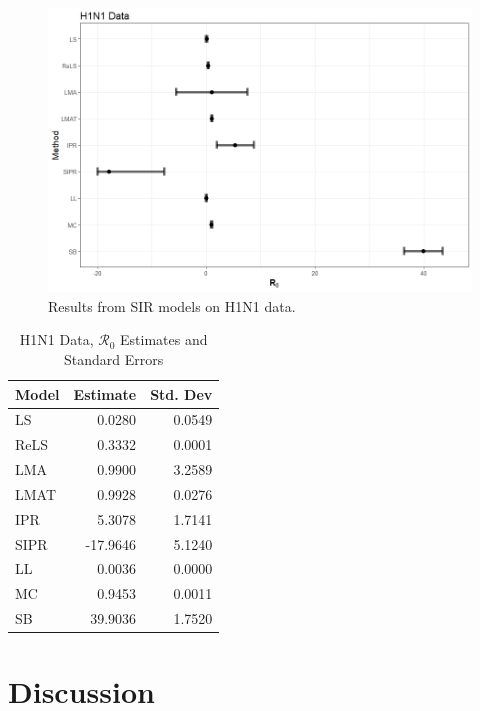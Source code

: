 \documentclass[12pt]{article}
\newcommand{\rr}{\ensuremath{\mathcal{R}_0}}
\begin{document}
\begin{figure}[H]
	\centering
	\includegraphics[width=\textwidth]{images/h1n1.jpeg}
	\caption{Results from SIR models on H1N1 data.}
\end{figure}

\begin{table}[H]
	
	
	\centering
	\begin{tabular}[t]{l|r|r}
		\hline
		Model & Estimate & Std. Dev\\
		\hline
		LS & 0.0280 & 0.0549\\
		\hline
		ReLS & 0.3332 & 0.0001\\
		\hline
		LMA & 0.9900 & 3.2589\\
		\hline
		LMAT & 0.9928 & 0.0276\\
		\hline
		IPR & 5.3078 & 1.7141\\
		\hline
		SIPR & -17.9646 & 5.1240\\
		\hline
		LL & 0.0036 & 0.0000\\
		\hline
		MC & 0.9453 & 0.0011\\
		\hline
		SB & 39.9036 & 1.7520\\
		\hline
	\end{tabular}
	\caption{H1N1 Data, $\rr$ Estimates and Standard Errors}
\end{table}
      

      
\section{Discussion}\label{sec:discussion}

\end{document}
